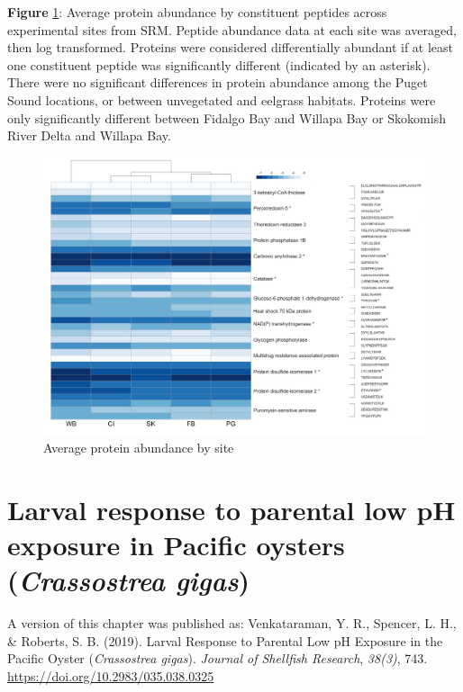 \documentclass [11pt, proquest] {uwthesis}[2015/03/03]
\begin{document}
\textbf{Figure} \ref{fig:protheatmap}: Average protein abundance by constituent peptides across experimental sites from SRM. Peptide abundance data at each site was averaged, then log transformed. Proteins were considered differentially abundant if at least one constituent peptide was significantly different (indicated by an asterisk). There were no significant differences in protein abundance among the Puget Sound locations, or between unvegetated and eelgrass habitats. Proteins were only significantly different between Fidalgo Bay and Willapa Bay or Skokomish River Delta and Willapa Bay.\newline
\begin{figure}[h]
\centering
  \includegraphics[width=1\textwidth]{figure/Ch1/fig1.4.png}
  \caption{Average protein abundance by site}
  \label{fig:protheatmap}
\end{figure}
\hypertarget{larval-response-to-parental-low-ph-exposure-in-pacific-oysters-crassostrea-gigas}{%
\chapter{\texorpdfstring{Larval response to parental low pH exposure in Pacific oysters (\emph{Crassostrea gigas})}{Larval response to parental low pH exposure in Pacific oysters (Crassostrea gigas)}}\label{larval-response-to-parental-low-ph-exposure-in-pacific-oysters-crassostrea-gigas}}

A version of this chapter was published as: Venkataraman, Y. R., Spencer, L. H., \& Roberts, S. B. (2019). Larval Response to Parental Low pH Exposure in the Pacific Oyster (\emph{Crassostrea gigas}). \emph{Journal of Shellfish Research}, \emph{38(3)}, 743. \url{https://doi.org/10.2983/035.038.0325}
\end{document}
